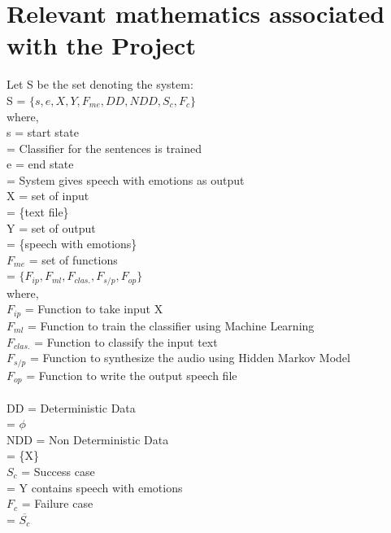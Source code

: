 \documentclass[oneside,a4paper,12pt]{book}
\begin{document}
\section{Relevant mathematics associated with the Project}
\label{sec:math}
Let S be the set denoting the system:\\
S = $\{ s, e, X, Y, F_{me}, DD, NDD, S_{c}, F_{c} \}$\\
where,\\
s = start state\\
\hspace*{5pt}  = Classifier for the sentences is trained\\
e = end state\\
\hspace*{5pt}  = System gives speech with emotions as output\\
X = set of input\\
\hspace*{5pt}  = \{text file\}\\
Y = set of output\\
\hspace*{5pt} = \{speech with emotions\}\\
$F_{me}$ = set of functions\\
\hspace*{5pt} = $\{F_{ip}, F_{ml}, F_{clas.}, F_{s/p}, F_{op}\}$\\
where,\\
$F_{ip}$ = Function to take input X\\
$F_{ml}$ = Function to train the classifier using Machine Learning\\
$F_{clas.}$ = Function to classify the input text\\
$F_{s/p}$ = Function to synthesize the audio using Hidden Markov Model\\
$F_{op}$ = Function to write the output speech file\\\\
DD = Deterministic Data\\
\hspace*{20pt}= $\phi$ \\
NDD = Non Deterministic Data\\
\hspace*{30pt} = \{X\}\\
$S_{c}$ = Success case\\
\hspace*{10pt} = Y contains speech with emotions\\
$F_{c}$ = Failure case\\
\hspace*{10pt} = $\overline{S_{c}}$
\end{document}
